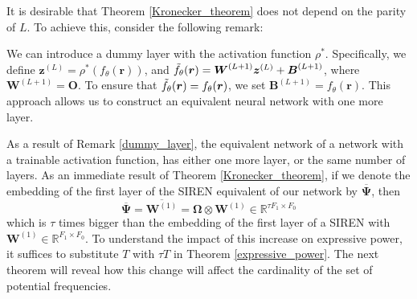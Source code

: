 It is desirable that Theorem \eqref{Kronecker_theorem} does not depend on the parity of $L$. To achieve this, consider the following remark:
\begin{remark} \label{dummy_layer}
     We can introduce a dummy layer with the activation function $\rho^*$. Specifically, we define $\boldsymbol{z}^{(L)}=\rho^*\left(f_\theta(\boldsymbol{r})\right)$, and $\Tilde{f_\theta}(\boldsymbol{r}) = \boldsymbol{W}^{(L+1)}\boldsymbol{z}^{(L)}+\boldsymbol{B}^{(L+1)}$, where $\boldsymbol{W}^{(L+1)}=\boldsymbol{O}$. To ensure that $\Tilde{f_\theta}(\boldsymbol{r}) =f_\theta(\boldsymbol{r})$, we set $\boldsymbol{B}^{(L+1)}=f_\theta(\boldsymbol{r})$. This approach allows us to construct an equivalent neural network with one more layer.
\end{remark}
As a result of Remark \eqref{dummy_layer}, the equivalent network of a network with a trainable activation function, has either one more layer, or the same number of layers.
As an immediate result of Theorem \eqref{Kronecker_theorem}, if we denote the embedding of the first layer of the SIREN equivalent of our network by $\boldsymbol{\overline{\Psi}}$, then
\begin{equation}
    \boldsymbol{\overline{\Psi}}=\overline{\boldsymbol{W}^{(1)}}=\boldsymbol{\Omega}\otimes\boldsymbol{W}^{(1)}\in\mathbb{R}^{\tau F_1\times F_0}
\end{equation}
which is $\tau$ times bigger than the embedding of the first layer of a SIREN with $\boldsymbol{W}^{(1)}\in \mathbb{R}^{F_1\times F_0}$. To understand the impact of this increase on expressive power, it suffices to substitute $T$ with $\tau T$ in Theorem \eqref{expressive_power}.  The next theorem will reveal how this change will affect the cardinality of the set of potential frequencies.

